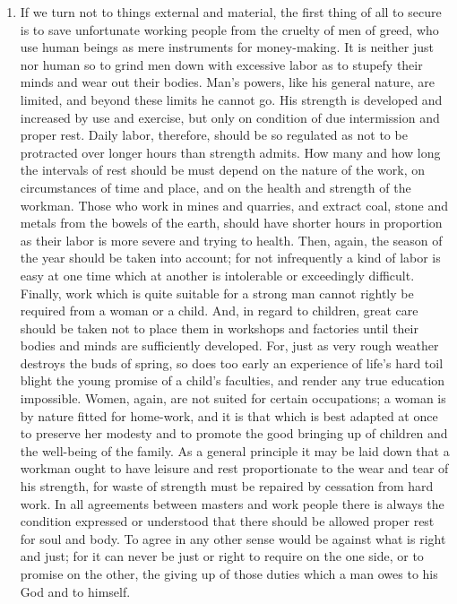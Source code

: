 \documentclass{book}
\begin{document}
\begin{enumerate}
	\item If we turn not to things external and material, the first thing of all to secure is to save unfortunate working people from the cruelty of men of greed, who use human beings as mere instruments for money-making. It is neither just nor human so to grind men down with excessive labor as to stupefy their minds and wear out their bodies. Man’s powers, like his general nature, are limited, and beyond these limits he cannot go. His strength is developed and increased by use and exercise, but only on condition of due intermission and proper rest. Daily labor, therefore, should be so regulated as not to be protracted over longer hours than strength admits. How many and how long the intervals of rest should be must depend on the nature of the work, on circumstances of time and place, and on the health and strength of the workman. Those who work in mines and quarries, and extract coal, stone and metals from the bowels of the earth, should have shorter hours in proportion as their labor is more severe and trying to health. Then, again, the season of the year should be taken into account; for not infrequently a kind of labor is easy at one time which at another is intolerable or exceedingly difficult. Finally, work which is quite suitable for a strong man cannot rightly be required from a woman or a child. And, in regard to children, great care should be taken not to place them in workshops and factories until their bodies and minds are sufficiently developed. For, just as very rough weather destroys the buds of spring, so does too early an experience of life’s hard toil blight the young promise of a child’s faculties, and render any true education impossible. Women, again, are not suited for certain occupations; a woman is by nature fitted for home-work, and it is that which is best adapted at once to preserve her modesty and to promote the good bringing up of children and the well-being of the family. As a general principle it may be laid down that a workman ought to have leisure and rest proportionate to the wear and tear of his strength, for waste of strength must be repaired by cessation from hard work. In all agreements between masters and work people there is always the condition expressed or understood that there should be allowed proper rest for soul and body. To agree in any other sense would be against what is right and just; for it can never be just or right to require on the one side, or to promise on the other, the giving up of those duties which a man owes to his God and to himself.



\end{enumerate}
\end{document}
